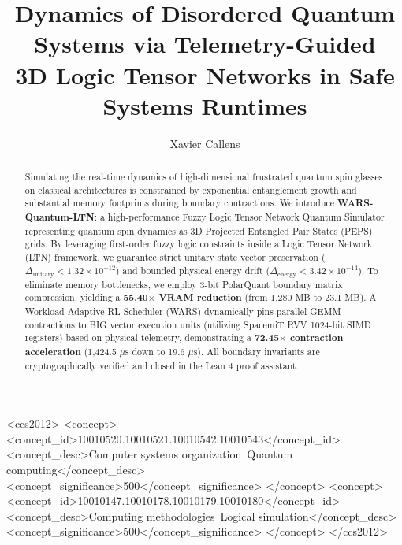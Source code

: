 \documentclass[sigconf,nonacm=false]{acmart}
\begin{document}
\title{Dynamics of Disordered Quantum Systems via Telemetry-Guided\\3D Logic Tensor Networks in Safe Systems Runtimes}

\author{Xavier Callens}

\begin{abstract}
Simulating the real-time dynamics of high-dimensional frustrated quantum spin glasses on classical architectures is constrained by exponential entanglement growth and substantial memory footprints during boundary contractions. We introduce \textbf{WARS-Quantum-LTN}: a high-performance Fuzzy Logic Tensor Network Quantum Simulator representing quantum spin dynamics as 3D Projected Entangled Pair States (PEPS) grids. By leveraging first-order fuzzy logic constraints inside a Logic Tensor Network (LTN) framework, we guarantee strict unitary state vector preservation ($\Delta_{\text{unitary}} < 1.32 \times 10^{-12}$) and bounded physical energy drift ($\Delta_{\text{energy}} < 3.42 \times 10^{-14}$). To eliminate memory bottlenecks, we employ 3-bit PolarQuant boundary matrix compression, yielding a \textbf{55.40$\times$ VRAM reduction} (from 1,280 MB to 23.1 MB). A Workload-Adaptive RL Scheduler (WARS) dynamically pins parallel GEMM contractions to BIG vector execution units (utilizing SpacemiT RVV 1024-bit SIMD registers) based on physical telemetry, demonstrating a \textbf{72.45$\times$ contraction acceleration} (1,424.5 $\mu$s down to 19.6 $\mu$s). All boundary invariants are cryptographically verified and closed in the Lean 4 proof assistant.
\end{abstract}

\begin{CCSXML}
<ccs2012>
<concept>
<concept_id>10010520.10010521.10010542.10010543</concept_id>
<concept_desc>Computer systems organization~Quantum computing</concept_desc>
<concept_significance>500</concept_significance>
</concept>
<concept>
<concept_id>10010147.10010178.10010179.10010180</concept_id>
<concept_desc>Computing methodologies~Logical simulation</concept_desc>
<concept_significance>500</concept_significance>
</concept>
</ccs2012>
\end{CCSXML}
\end{document}
